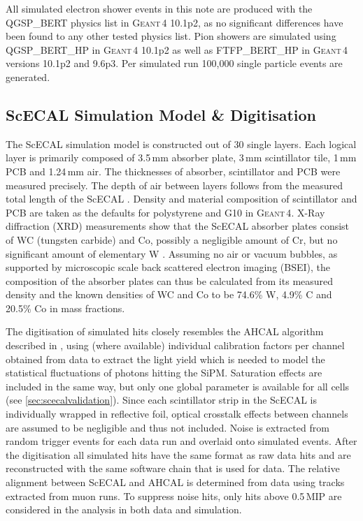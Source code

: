 \documentclass[twoside,a4paper,12pt]{article}
\newcommand\geant{\textsc{Geant\,4}\xspace}
\begin{document}
All simulated electron shower events in this note are produced with the QGSP\_BERT physics list in \geant 10.1p2, as no significant differences have been found to any other tested physics list. Pion showers are simulated using QGSP\_BERT\_HP in \geant 10.1p2 as well as FTFP\_BERT\_HP in \geant versions 10.1p2 and 9.6p3. Per simulated run 100,000 single particle events are generated.

\subsection{ScECAL Simulation Model \& Digitisation}
The ScECAL simulation model is constructed out of 30 single layers. Each logical layer is primarily composed of 3.5\,mm absorber plate, 3\,mm scintillator tile, 1\,mm PCB and 1.24\,mm air. The thicknesses of absorber, scintillator and PCB were measured precisely. The depth of air between layers follows from the measured total length of the ScECAL \cite{CAN16}. Density and material composition of scintillator and PCB are taken as the defaults for polystyrene and G10 in \geant. X-Ray diffraction (XRD) measurements show that the ScECAL absorber plates consist of WC (tungsten carbide) and Co, possibly a negligible amount of Cr, but no significant amount of elementary W \cite{ScECALAbsorber}. Assuming no air or vacuum bubbles, as supported by microscopic scale back scattered electron imaging (BSEI), the composition of the absorber plates can thus be calculated from its measured density and the known densities of WC and Co to be 74.6\% W, 4.9\% C and 20.5\% Co in mass fractions.

The digitisation of simulated hits closely resembles the AHCAL algorithm described in \cite{EMPaper}, using (where available) individual calibration factors per channel obtained from data to extract the light yield which is needed to model the statistical fluctuations of photons hitting the SiPM. Saturation effects are included in the same way, but only one global parameter is available for all cells (see \autoref{sec:scecalvalidation}). Since each scintillator strip in the ScECAL is individually wrapped in reflective foil, optical crosstalk effects between channels are assumed to be negligible and thus not included. Noise is extracted from random trigger events for each data run and overlaid onto simulated events. After the digitisation all simulated hits have the same format as raw data hits and are reconstructed with the same software chain that is used for data. The relative alignment between ScECAL and AHCAL is determined from data using tracks extracted from muon runs. To suppress noise hits, only hits above 0.5\,MIP are considered in the analysis in both data and simulation. 
\end{document}
